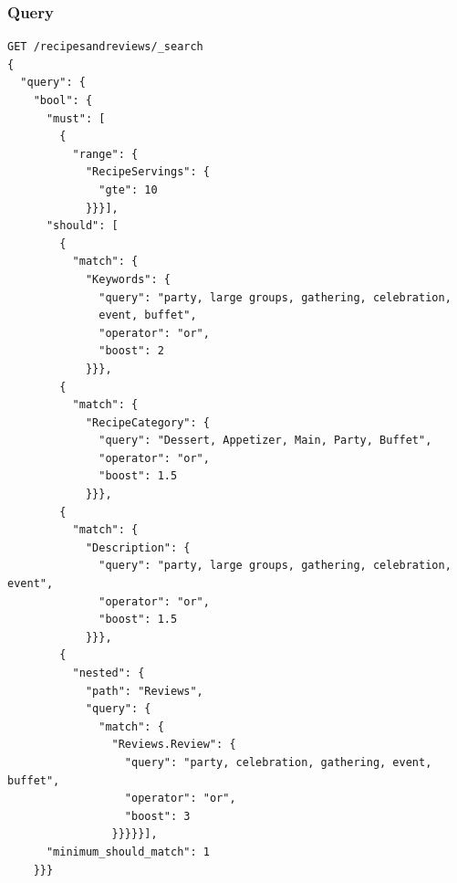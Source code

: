 \begin{enumerate}
    \subsubsection{Query}
    \begin{lstlisting}[language=Elasticsearch]
GET /recipesandreviews/_search
{
  "query": {
    "bool": {
      "must": [
        {
          "range": {
            "RecipeServings": {
              "gte": 10
            }}}],
      "should": [
        {
          "match": {
            "Keywords": {
              "query": "party, large groups, gathering, celebration, 
              event, buffet",
              "operator": "or",
              "boost": 2
            }}},
        {
          "match": {
            "RecipeCategory": {
              "query": "Dessert, Appetizer, Main, Party, Buffet",
              "operator": "or",
              "boost": 1.5
            }}},
        {
          "match": {
            "Description": {
              "query": "party, large groups, gathering, celebration, event",
              "operator": "or",
              "boost": 1.5
            }}},
        {
          "nested": {
            "path": "Reviews",
            "query": {
              "match": {
                "Reviews.Review": {
                  "query": "party, celebration, gathering, event, buffet",
                  "operator": "or",
                  "boost": 3
                }}}}}],
      "minimum_should_match": 1
    }}}
    \end{lstlisting}


\end{enumerate}
